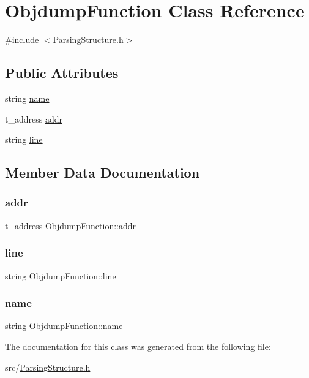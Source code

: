 \hypertarget{classObjdumpFunction}{}\section{Objdump\+Function Class Reference}
\label{classObjdumpFunction}


{\ttfamily \#include $<$Parsing\+Structure.\+h$>$}

\subsection*{Public Attributes}
\begin{DoxyCompactItemize}
\item 
string \hyperlink{classObjdumpFunction_a9b888572d051a5b6c101b65d207d0154}{name}
\item 
t\+\_\+address \hyperlink{classObjdumpFunction_a5c44504ae2b34b910210d8602e4d19cd}{addr}
\item 
string \hyperlink{classObjdumpFunction_a4872e7fb22baa03ee385087174586b6f}{line}
\end{DoxyCompactItemize}


\subsection{Member Data Documentation}
\mbox{\label{classObjdumpFunction_a5c44504ae2b34b910210d8602e4d19cd}} 
\subsubsection{\texorpdfstring{addr}{addr}}
{\footnotesize\ttfamily t\+\_\+address Objdump\+Function\+::addr}

\mbox{\label{classObjdumpFunction_a4872e7fb22baa03ee385087174586b6f}} 
\subsubsection{\texorpdfstring{line}{line}}
{\footnotesize\ttfamily string Objdump\+Function\+::line}

\mbox{\label{classObjdumpFunction_a9b888572d051a5b6c101b65d207d0154}} 
\subsubsection{\texorpdfstring{name}{name}}
{\footnotesize\ttfamily string Objdump\+Function\+::name}



The documentation for this class was generated from the following file\+:\begin{DoxyCompactItemize}
\item 
src/\hyperlink{ParsingStructure_8h}{Parsing\+Structure.\+h}\end{DoxyCompactItemize}
